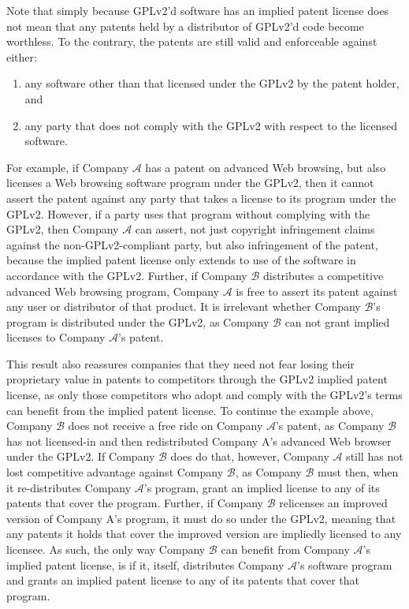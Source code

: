Note that simply because GPLv2'd software has an implied patent license does
not mean that any patents held by a distributor of GPLv2'd code become
worthless. To the contrary, the patents are still valid and enforceable
against either:

\begin{enumerate}
 \renewcommand{\theenumi}{\alph{enumi}}
 \renewcommand{\labelenumi}{\textup{(\theenumi)}}

\item any software other than that licensed under the GPLv2 by the patent
  holder, and

\item any party that does not comply with the GPLv2
with respect to the licensed software.
\end{enumerate}

\newcommand{\compB}{$\mathcal{B}$}
\newcommand{\compA}{$\mathcal{A}$}

For example, if Company \compA{} has a patent on advanced Web browsing, but
also licenses a Web browsing software program under the GPLv2, then it
cannot assert the patent against any party that takes a license to its
program under the GPLv2. However, if a party uses that program without
complying with the GPLv2, then Company \compA{} can assert, not just copyright
infringement claims against the non-GPLv2-compliant party, but also
infringement of the patent, because the implied patent license only
extends to use of the software in accordance with the GPLv2. Further, if
Company \compB{} distributes a competitive advanced Web browsing program,
Company \compA{} is free to assert its patent against any user or
distributor of that product. It is irrelevant whether Company \compB's
program is distributed under the GPLv2, as Company \compB{} can not grant
implied licenses to Company \compA's patent.

This result also reassures companies that they need not fear losing their
proprietary value in patents to competitors through the GPLv2 implied patent
license, as only those competitors who adopt and comply with the GPLv2's
terms can benefit from the implied patent license. To continue the
example above, Company \compB{} does not receive a free ride on Company
\compA's patent, as Company \compB{} has not licensed-in and then
redistributed Company A's advanced Web browser under the GPLv2. If Company
\compB{} does do that, however, Company \compA{} still has not lost
competitive advantage against Company \compB{}, as Company \compB{} must then,
when it re-distributes Company \compA's program, grant an implied license
to any of its patents that cover the program. Further, if Company \compB{}
relicenses an improved version of Company A's program, it must do so under
the GPLv2, meaning that any patents it holds that cover the improved version
are impliedly licensed to any licensee. As such, the only way Company
\compB{} can benefit from Company \compA's implied patent license, is if it,
itself, distributes Company \compA's software program and grants an
implied patent license to any of its patents that cover that program.

